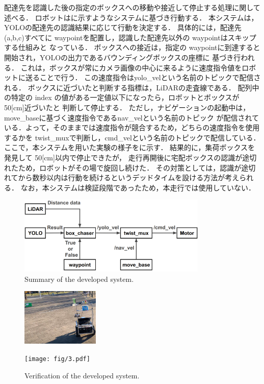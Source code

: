 \documentclass[twocolumn, 9pt]{jsproceedings}
\begin{document}
配達先を認識した後の指定のボックスへの移動や接近して停止する処理に関して述べる．
ロボットはに示すようなシステムに基づき行動する．
本システムは，YOLOの配達先の認識結果に応じて行動を決定する．
具体的には，配達先(a,b,c)すべてに waypointを配置し，認識した配達先以外の waypointはスキップする仕組みと
なっている．
ボックスへの接近は，指定の waypointに到達すると開始され，YOLOの出力であるバウンディングボックスの座標に
基づき行われる．
これは，ボックスが常にカメラ画像の中心に来るように速度指令値をロボットに送ることで行う．
この速度指令はyolo\_velという名前のトピックで配信される．
ボックスに近づいたと判断する指標は，LiDARの走査線である．
配列中の特定の index の値がある一定値以下になったら，ロボットとボックスが 50[cm]近づいたと
判断して停止する．
ただし，ナビゲーションの起動中は，move\_baseに基づく速度指令であるnav\_velという名前のトピック
が配信されている．よって，そのままでは速度指令が競合するため，どちらの速度指令を使用するかを
twist\_mux\cite{twist}で判断し，cmd\_velという名前のトピックで配信している．
ここで，本システムを用いた実験の様子をに示す．
結果的に，集荷ボックスを発見して 50[cm]以内で停止できたが，
走行再開後に宅配ボックスの認識が途切れたため，ロボットがその場で旋回し続けた．
その対策としては，認識が途切れてから数秒以内は行動を続けるというデッドタイムを設ける方法が考えられる．
なお，本システムは検証段階であったため，本走行では使用していない．

\begin{figure}[h!]
  \centering
  \includegraphics[width=90mm]{fig/act.pdf}
  \caption{Summary of the developed system.}
  \label{fig:hako_act}
\end{figure}

\vspace*{-1zh}

\begin{figure}[h]
  \centering
  \begin{minipage}[b]{0.45\linewidth}
    \centering
    \includegraphics[width=37mm]{fig/1.pdf}
    \caption*{(a) Found the box}
  \end{minipage} 
  \hspace*{2mm}
  \begin{minipage}[b]{0.45\linewidth}
    \centering
    \texttt{[image: fig/3.pdf]}
    \caption*{\hspace*{-1mm}(b) Stop near the box}
  \end{minipage}
  \caption{Verification of the developed system.}
  \label{fig:action}
\end{figure}
\end{document}
